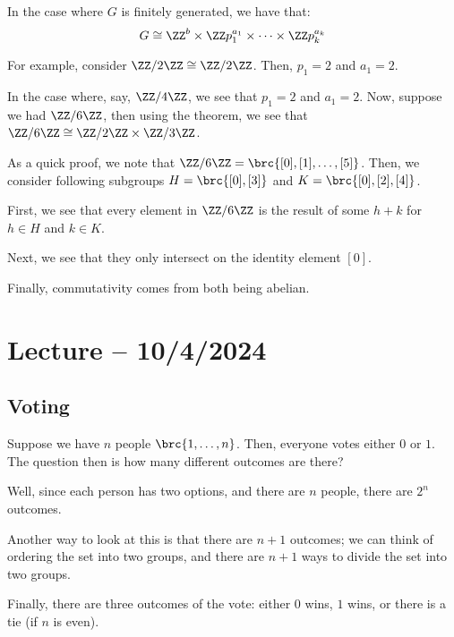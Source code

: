 \documentclass[openany]{book}
\begin{document}
In the case where $G$ is finitely generated, we have that:
\begin{equation*}
	G \cong \ZZ^{b} \times \ZZ p_1^{a_1} \times \cdots \times \ZZ p_k^{a_k}
\end{equation*}

\begin{example}
	For example, consider $\ZZ/2\ZZ \cong \ZZ/2\ZZ$. Then, $p_1 = 2$ and $a_1 = 2$.
	
	In the case where, say, $\ZZ/4\ZZ$, we see that $p_1 = 2$ and $a_1 = 2$. Now, suppose we had $\ZZ/6\ZZ$, then using the theorem, we see that $\ZZ/6\ZZ \cong \ZZ/2\ZZ \times \ZZ/3\ZZ$.
	\begin{innerproof}
		As a quick proof, we note that $\ZZ/6\ZZ = \brc{[0], [1], \ldots, [5]}$. Then, we consider following subgroups $H = \brc{[0], [3]}$ and $K = \brc{[0], [2], [4]}$.
		
		First, we see that every element in $\ZZ/6\ZZ$ is the result of some $h + k$ for $h \in H$ and $k \in K$.
		
		Next, we see that they only intersect on the identity element $[0]$.
		
		Finally, commutativity comes from both being abelian.
	\end{innerproof}
\end{example}

\section{Lecture -- 10/4/2024}
\subsection{Voting}
\begin{example}
	Suppose we have $n$ people $\brc{1, \ldots, n}$. Then, everyone votes either $0$ or $1$. The question then is how many different outcomes are there?
	
	Well, since each person has two options, and there are $n$ people, there are $2^{n}$ outcomes.
	
	Another way to look at this is that there are $n+1$ outcomes; we can think of ordering the set into two groups, and there are $n+1$ ways to divide the set into two groups.
	
	Finally, there are three outcomes of the vote: either $0$ wins, $1$ wins, or there is a tie (if $n$ is even).
\end{example}
\end{document}
